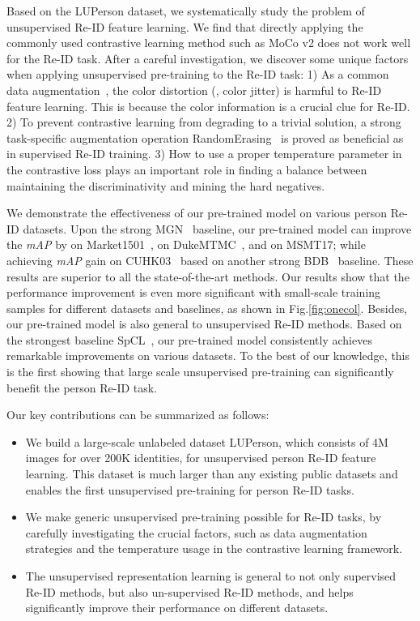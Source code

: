 \documentclass[final]{cvpr}
\begin{document}
Based on the LUPerson dataset, we systematically study the problem of unsupervised Re-ID feature learning. We find that directly applying the commonly used contrastive learning method such as MoCo v2 \cite{chen2020improved} does not work well for the Re-ID task. After a careful investigation, we discover some  unique factors when applying unsupervised pre-training to the Re-ID task: 1) As a common data augmentation~\cite{he2020momentum,chen2020big,caron2020unsupervised}, the color distortion (\eg, color jitter) is harmful to Re-ID feature learning. This is because the color information is a crucial clue for Re-ID. 2) To prevent contrastive learning from degrading to a trivial solution,  a strong task-specific augmentation operation RandomErasing~\cite{zhong2020random} is proved as beneficial as in supervised Re-ID training. 3) How to use a proper temperature parameter in the contrastive loss plays an important role in finding a balance between  maintaining the discriminativity and mining the hard negatives.

We demonstrate the effectiveness of our pre-trained model on various person Re-ID datasets. Upon the strong MGN~\cite{wang2018learning} baseline, our pre-trained model can improve the \emph{mAP} by  on Market1501~\cite{Zheng2015ScalablePR},  on DukeMTMC~\cite{zheng2017unlabeled}, and  on MSMT17\cite{wei2018person}; while achieving  \emph{mAP} gain on CUHK03~\cite{Zheng2015ScalablePR} based on another strong BDB~\cite{dai2019batch} baseline. These results are superior to all the state-of-the-art methods. Our results show that the performance improvement is even more significant with small-scale training samples for different datasets and baselines, as shown in Fig.\ref{fig:onecol}. Besides, our pre-trained model is also general to unsupervised Re-ID methods. Based on the strongest baseline SpCL~\cite{ge2020selfpaced}, our pre-trained model consistently achieves remarkable improvements on various datasets. To the best of our knowledge, this is the first showing that large scale unsupervised pre-training can significantly benefit the person Re-ID task.

Our key contributions can be summarized as follows:
\begin{itemize}
    \item We build a large-scale unlabeled dataset LUPerson, which consists of 4M images for over 200K identities, for unsupervised person Re-ID feature learning. This dataset is much larger than any existing public datasets and enables the first unsupervised pre-training for person Re-ID tasks.
    \item We make generic unsupervised pre-training possible for Re-ID tasks, by carefully investigating the crucial factors, such as data augmentation strategies and the temperature usage in the contrastive learning framework.
    \item The unsupervised representation learning is general to not only supervised Re-ID methods, but also un-supervised Re-ID methods, and helps significantly improve their performance on different datasets.
\end{itemize}
\end{document}
